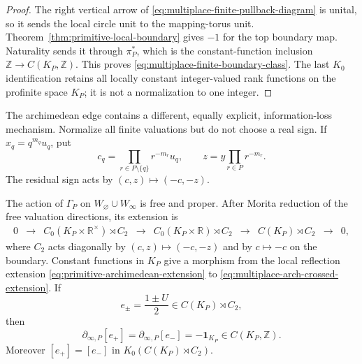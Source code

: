 \begin{proof}
The right vertical arrow of
\eqref{eq:multiplace-finite-pullback-diagram} is unital, so it sends the local
circle unit to the mapping-torus unit.  Theorem~\ref{thm:primitive-local-boundary}
gives $-1$ for the top boundary map.  Naturality sends it through
$\pi_P^*$, which is the constant-function inclusion
$\mathbb Z\to C(K_P,\mathbb Z)$.  This proves
\eqref{eq:multiplace-finite-boundary-class}.  The last $K_0$ identification
retains all locally constant integer-valued rank functions on the profinite
space $K_P$; it is not a normalization to one integer.
\end{proof}

The archimedean edge contains a different, equally explicit, information-loss
mechanism.  Normalize all finite valuations but do not choose a real sign.  If
$x_q=q^{m_q}u_q$, put
\begin{equation}
 c_q=\prod_{r\in P\setminus\{q\}}r^{-m_r}u_q,
 \qquad z=y\prod_{r\in P}r^{-m_r}.
 \label{eq:multiplace-arch-normalization}
\end{equation}
The residual sign acts by $(c,z)\mapsto(-c,-z)$.

\begin{theorem}
\label{thm:multiplace-arch-boundary}
The action of $\Gamma_P$ on $W_{\varnothing}\cup W_\infty$ is free and
proper.  After Morita reduction of the free valuation directions, its
extension is
\begin{equation}
\begin{array}{ccccccccc}
0&\to&C_0(K_P\times\mathbb R^\times)\rtimes C_2
&\to&C_0(K_P\times\mathbb R)\rtimes C_2
&\to&C(K_P)\rtimes C_2&\to&0,
\end{array}
\label{eq:multiplace-arch-crossed-extension}
\end{equation}
where $C_2$ acts diagonally by $(c,z)\mapsto(-c,-z)$ and by
$c\mapsto-c$ on the boundary.  Constant functions in $K_P$ give a morphism
from the local reflection extension
\eqref{eq:primitive-archimedean-extension} to
\eqref{eq:multiplace-arch-crossed-extension}.  If
\[
 e_\pm=\frac{1\pm U}{2}\in C(K_P)\rtimes C_2,
\]
then
\begin{equation}
 \partial_{\infty,P}[e_+]
 =\partial_{\infty,P}[e_-]
 =-\mathbf1_{K_P}\in C(K_P,\mathbb Z).
 \label{eq:multiplace-arch-boundary-classes}
\end{equation}
Moreover $[e_+]=[e_-]$ in $K_0(C(K_P)\rtimes C_2)$.
\end{theorem}

